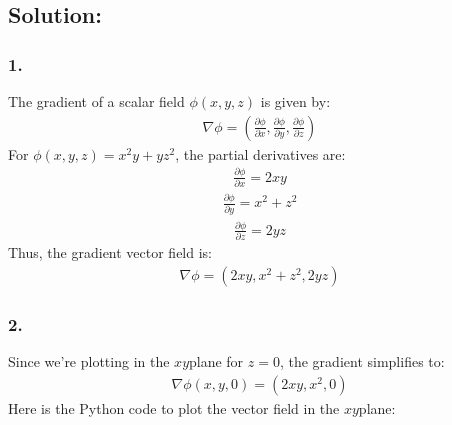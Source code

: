 \documentclass[letterpaper,10pt,english]{jupyterBook}
\begin{document}
\subsection{Solution:}
\label{\detokenize{prerequisites:id10}}

\subsubsection{1. }
\label{\detokenize{prerequisites:gradient-of-the-scalar-field}}
\sphinxAtStartPar
The gradient of a scalar field \(\phi(x, y, z)\) is given by:
\begin{equation*}
\begin{split}
\nabla \phi = \left( \frac{\partial \phi}{\partial x}, \frac{\partial \phi}{\partial y}, \frac{\partial \phi}{\partial z} \right)
\end{split}
\end{equation*}
\sphinxAtStartPar
For \(\phi(x, y, z) = x^2 y + yz^2\), the partial derivatives are:
\begin{equation*}
\begin{split}
\frac{\partial \phi}{\partial x} = 2xy
\end{split}
\end{equation*}\begin{equation*}
\begin{split}
\frac{\partial \phi}{\partial y} = x^2 + z^2
\end{split}
\end{equation*}\begin{equation*}
\begin{split}
\frac{\partial \phi}{\partial z} = 2yz
\end{split}
\end{equation*}
\sphinxAtStartPar
Thus, the gradient vector field is:
\begin{equation*}
\begin{split}
\nabla \phi = (2xy, x^2 + z^2, 2yz)
\end{split}
\end{equation*}

\subsubsection{2. }
\label{\detokenize{prerequisites:plotting-the-gradient-field-in-the-xy-plane}}
\sphinxAtStartPar
Since we’re plotting in the \(xy\)\sphinxhyphen{}plane for \(z = 0\), the gradient simplifies to:
\begin{equation*}
\begin{split}
\nabla \phi(x, y, 0) = (2xy, x^2, 0)
\end{split}
\end{equation*}
\sphinxAtStartPar
Here is the Python code to plot the vector field in the \(xy\)\sphinxhyphen{}plane:
\end{document}
